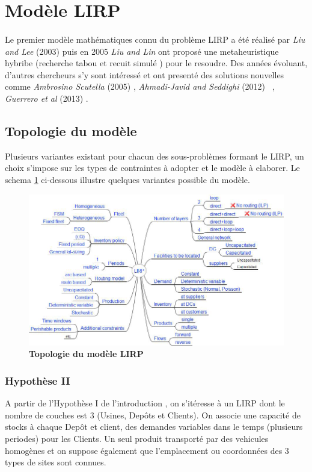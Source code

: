 \documentclass[a4paper,10pt]{article}
\begin{document}
\section{Modèle LIRP}
\paragraph{}
Le premier modèle mathématiques connu du problème LIRP a été réalisé par \emph{ Liu and Lee} (2003) \cite{} puis en 2005 
\emph{Liu and Lin} \cite{} ont proposé une metaheuristique hybribe (recherche tabou et recuit simulé ) pour le resoudre. Des années évoluant,
d'autres chercheurs s'y sont intéressé et ont presenté des solutions nouvelles comme \emph{Ambrosino Scutella} (2005) \cite{}, 
\emph{Ahmadi-Javid and Seddighi} (2012) \cite{} , \emph{Guerrero et al} (2013) \cite{} .

\subsection{Topologie du modèle}
Plusieurs variantes existant pour chacun des sous-problèmes formant le LIRP, un choix s'impose sur les types de contraintes à adopter
et le modèle à elaborer. Le schema \ref{topology} ci-dessous illustre quelques variantes possible du modèle.
\begin{figure}[h]
\includegraphics[width=16cm]{topology.png}
\caption{\label{topology} \textbf{Topologie du modèle LIRP \cite{}}}
\end{figure}

\subsubsection{Hypothèse II}
A partir de l'Hypothèse I de l'introduction , on s'itéresse à un LIRP dont le nombre de couches est 3 (Usines, Depôts et Clients). On associe
une capacité de stocks à chaque Depôt et client, des demandes variables dans le temps (plusieurs periodes) pour les Clients. Un seul produit transporté par des vehicules homogènes et on suppose également que l'emplacement ou coordonnées
des 3 types de sites sont connues.
\end{document}
